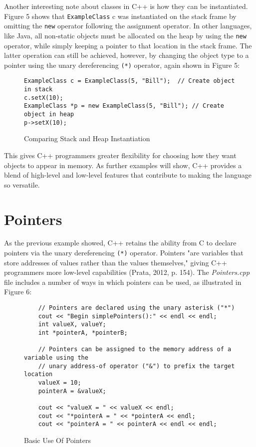 \documentclass[11pt]{article}
\begin{document}
	Another interesting note about classes in C++ is how they can be instantiated.  Figure 5 shows that \texttt{ExampleClass} c was instantiated on the stack frame by omitting the \texttt{new} operator following the assignment operator.  In other languages, like Java, all non-static objects must be allocated on the heap by using the \texttt{new} operator, while simply keeping a pointer to that location in the stack frame.  The latter operation can still be achieved, however, by changing the object type to a pointer using the unary dereferencing \texttt{(*)} operator, again shown in Figure 5:

\begin{figure}[!h]
\centering
\begin{BVerbatim}
ExampleClass c = ExampleClass(5, "Bill");  // Create object in stack
c.setX(10);
ExampleClass *p = new ExampleClass(5, "Bill"); // Create object in heap
p->setX(10);
\end{BVerbatim}
\caption{Comparing Stack and Heap Instantiation}
\end{figure} \FloatBarrier
	
\noindent
This gives C++ programmers greater flexibility for choosing how they want objects to appear in memory.  As further examples will show, C++ provides a blend of high-level and low-level features that contribute to making the language so versatile.

\section{Pointers}

	As the previous example showed, C++ retains the ability from C to declare pointers via the unary dereferencing \texttt{(*)} operator.  Pointers "are variables that store addresses of values rather than the values themselves," giving C++ programmers more low-level capabilities (Prata, 2012, p. 154).  The \textit{Pointers.cpp} file includes a number of ways in which pointers can be used, as illustrated in Figure 6:

\begin{figure}[!h]
\centering
\begin{BVerbatim}
	// Pointers are declared using the unary asterisk ("*")
	cout << "Begin simplePointers():" << endl << endl;
	int valueX, valueY;
	int *pointerA, *pointerB;

	// Pointers can be assigned to the memory address of a variable using the
	// unary address-of operator ("&") to prefix the target location
	valueX = 10;
	pointerA = &valueX;
	
	cout << "valueX = " << valueX << endl;
	cout << "*pointerA = " << *pointerA << endl;
	cout << "pointerA = " << pointerA << endl << endl;
\end{BVerbatim}
\caption{Basic Use Of Pointers}
\end{figure} \FloatBarrier
\end{document}
